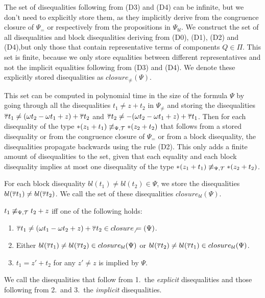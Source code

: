 The set of disequalities following from (D3) and (D4) can be infinite, but we don't need to explicitly store them, as they implicitly derive from the congruence closure of $\Psi_=$ or respectively from the propositions in $\Psi_{bl}$.
We construct the set of all disequalities and block disequalities deriving from (D0), (D1), (D2) and (D4),but only those that contain representative terms of components $Q\in\Pi$.
This set is finite, because we only store equalities between different representatives and not the implicit equalities following from (D3) and (D4).
We denote these explicitly stored disequalities as $closure_\neq(\Psi)$.

This set can be computed in polynomial time in the size of the formula $\Psi$ by going through all the
disequalities $t_1 \neq z + t_2$ in $\Psi_\neq$ and storing the disequalities
$\overline{\tau} t_1  \neq (\omega t_2 - \omega t_1 + z) + \overline{\tau} t_2$ and $\overline{\tau} t_2 \neq - (\omega t_2 - \omega t_1 + z) + \overline{\tau} t_1$.
Then for each disequality of the type $*(z_1 + t_1) \not\equiv_{\Psi,\mathcal{T}} *(z_2 + t_2)$ that follows from a stored disequality or from the congruence closure of $\Psi_=$ or from a block disequality,
the disequalities propagate backwards using the rule (D2).
This only adds a finite amount of disequalities to the set, given that each equality and each block disequality implies at most one disequality of the type $*(z_1 + t_1) \not\equiv_{\Psi,\mathcal{T}} *(z_2 + t_2)$.

For each block disequality $bl(t_1) \neq bl(t_2) \in \Psi$, we store the disequalities $bl(\overline{\tau} t_1) \neq bl(\overline{\tau} t_2)$.
We call the set of these disequalities $closure_{bl}(\Psi)$.

\begin{lemma}\label{lemma:diseq_types}
    $t_1 \not\equiv_{\Psi,\mathcal{T}} t_2 + z$ iff one of the following holds:

    \begin{enumerate}
        \item $\overline{\tau} t_1 \neq (\omega t_1 - \omega t_2 + z) + \overline{\tau} t_2 \in closure_\neq(\Psi)$.
        \item Either $bl(\overline{\tau} t_1) \neq bl(\overline{\tau} t_2) \in closure_{bl}(\Psi)$ or $bl(\overline{\tau} t_2) \neq bl(\overline{\tau} t_1) \in closure_{bl}(\Psi)$.
        \item $t_1 = z' + t_2$ for any $z' \neq z$ is implied by $\Psi$.
    \end{enumerate}
    We call the disequalities that follow from 1.\ the \emph{explicit} disequalities and those following from 2.\ and 3.\ the \emph{implicit} disequalities.
\end{lemma}
